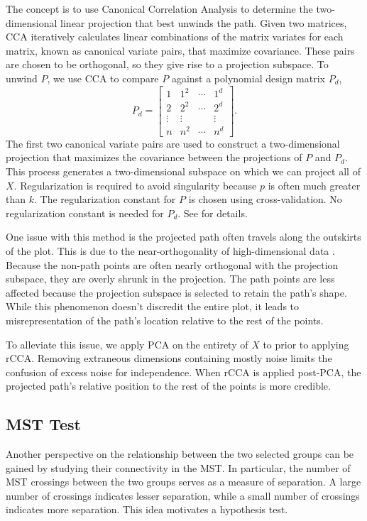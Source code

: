 \documentclass{article}
\begin{document}
{The concept is to use Canonical Correlation Analysis to determine the two-dimensional linear projection that best unwinds the path. Given two matrices, CCA iteratively calculates linear combinations of the matrix variates for each matrix, known as canonical variate pairs, that maximize covariance. These pairs are chosen to be orthogonal, so they give rise to a projection subspace. To unwind $P$, we use CCA to compare $P$ against a polynomial design matrix $P_d$, $$P_d = \begin{bmatrix}
1 & 1^2 & \cdots & 1^d \\
2 & 2^2 & \cdots & 2^d \\
\vdots & \vdots & & \vdots \\
n & n^2 & \cdots & n^d
\end{bmatrix}.$$
The first two canonical variate pairs are used to construct a two-dimensional projection that maximizes the covariance between the projections of $P$ and $P_d$. This process generates a two-dimensional subspace on which we can project all of $X$. Regularization is required to avoid singularity because $p$ is often much greater than $k$. The regularization constant for $P$ is chosen using cross-validation. No regularization constant is needed for $P_d$. See \cite{rCCA} for details.

One issue with this method is the projected path often travels along the outskirts of the plot. This is due to the near-orthogonality of high-dimensional data \cite{near-orthogonal}. Because the non-path points are often nearly orthogonal with the projection subspace, they are overly shrunk in the projection. The path points are less affected because the projection subspace is selected to retain the path's shape. While this phenomenon doesn't discredit the entire plot, it leads to misrepresentation of the path's location relative to the rest of the points.

To alleviate this issue, we apply PCA on the entirety of $X$ to prior to applying rCCA. Removing extraneous dimensions containing mostly noise limits the confusion of excess noise for independence. When rCCA is applied post-PCA, the projected path's relative position to the rest of the points is more credible.

\subsection{MST Test}
Another perspective on the relationship between the two selected groups can be gained by studying their connectivity in the MST. In particular, the number of MST crossings between the two groups serves as a measure of separation. A large number of crossings indicates lesser separation, while a small number of crossings indicates more separation. This idea motivates a hypothesis test.

}
\end{document}
